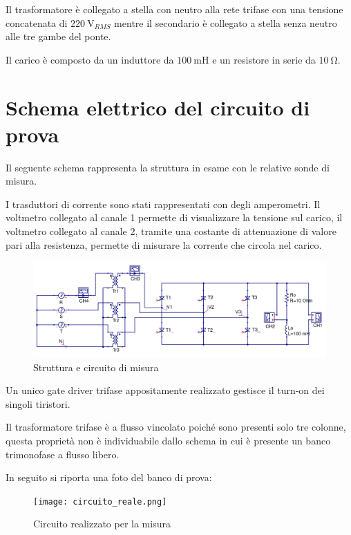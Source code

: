 \documentclass[a4paper,11pt]{article}
\begin{document}
Il trasformatore è collegato a stella con neutro alla rete trifase con una tensione
concatenata di $\SI{220}{\volt_{RMS}}$ mentre il secondario è collegato a stella 
senza neutro alle tre gambe del ponte.

Il carico è composto da un induttore da $\SI{100}{\milli\henry}$ e
un resistore in serie da $\SI{10}{\ohm}$.

\section{Schema elettrico del circuito di prova}
Il seguente schema rappresenta la struttura in esame con le relative sonde
di misura.

I trasduttori di corrente sono stati rappresentati con degli
amperometri. Il voltmetro collegato al canale 1 permette di visualizzare la 
tensione sul carico, il voltmetro collegato al canale 2, tramite una costante di 
attenuazione di valore pari alla resistenza, permette di misurare 
la corrente che circola nel carico.

\begin{figure}[H]
 \centering
 \includegraphics[keepaspectratio=true,width=0.95\linewidth]{circuito_qucs.png}
 \caption{Struttura e circuito di misura}
 \label{fig:circuito}
\end{figure}

Un unico gate driver trifase appositamente realizzato gestisce il turn-on
dei singoli tiristori.

Il trasformatore trifase è a flusso vincolato poiché sono presenti 
solo tre colonne, questa proprietà non è individuabile dallo schema in cui 
è presente un banco trimonofase a flusso libero.

In seguito si riporta una foto del banco di prova:
\begin{figure}[H]
 \centering
 \texttt{[image: circuito\_reale.png]}
 \caption{Circuito realizzato per la misura}
 \label{fig:circuito_reale}
\end{figure}
\end{document}
